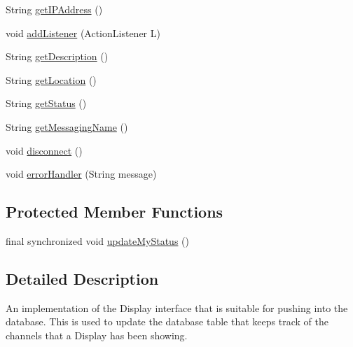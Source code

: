 \begin{DoxyCompactItemize}
\item 
String \hyperlink{classgov_1_1fnal_1_1ppd_1_1dd_1_1display_1_1client_1_1UpdateDatabaseForDisplayChannels_a2e49dee6b3facaacf44af23e8324dd6f}{get\-I\-P\-Address} ()
\item 
void \hyperlink{classgov_1_1fnal_1_1ppd_1_1dd_1_1display_1_1client_1_1UpdateDatabaseForDisplayChannels_a8e5f09fc6cc000ce10a80ee4b19db666}{add\-Listener} (Action\-Listener L)
\item 
String \hyperlink{classgov_1_1fnal_1_1ppd_1_1dd_1_1display_1_1client_1_1UpdateDatabaseForDisplayChannels_afb2e0f2aa3dd741909b329bf7fe743b4}{get\-Description} ()
\item 
String \hyperlink{classgov_1_1fnal_1_1ppd_1_1dd_1_1display_1_1client_1_1UpdateDatabaseForDisplayChannels_a753f8c4ad34a649221a78ad963f44d28}{get\-Location} ()
\item 
String \hyperlink{classgov_1_1fnal_1_1ppd_1_1dd_1_1display_1_1client_1_1UpdateDatabaseForDisplayChannels_a839b068caf40194233bb6040c6a7a29d}{get\-Status} ()
\item 
String \hyperlink{classgov_1_1fnal_1_1ppd_1_1dd_1_1display_1_1client_1_1UpdateDatabaseForDisplayChannels_a6bd0e5cfb4362cd534592faf1df8e381}{get\-Messaging\-Name} ()
\item 
void \hyperlink{classgov_1_1fnal_1_1ppd_1_1dd_1_1display_1_1client_1_1UpdateDatabaseForDisplayChannels_a16818671921624744a8323ef36766517}{disconnect} ()
\item 
void \hyperlink{classgov_1_1fnal_1_1ppd_1_1dd_1_1display_1_1client_1_1UpdateDatabaseForDisplayChannels_aa76c9578b86e1ffed9c4287d3633f821}{error\-Handler} (String message)
\end{DoxyCompactItemize}
\subsection*{Protected Member Functions}
\begin{DoxyCompactItemize}
\item 
final synchronized void \hyperlink{classgov_1_1fnal_1_1ppd_1_1dd_1_1display_1_1client_1_1UpdateDatabaseForDisplayChannels_a1743e409cda7e6d714197c2ec35cdece}{update\-My\-Status} ()
\end{DoxyCompactItemize}


\subsection{Detailed Description}
An implementation of the Display interface that is suitable for pushing into the database. This is used to update the database table that keeps track of the channels that a Display has been showing. 

